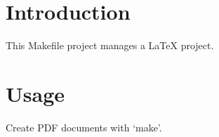 \documentclass{article}
\begin{document}
\maketitle
\tableofcontents
\section{Introduction}
This Makefile project manages a \LaTeX{} project.
\section{Usage}
Create PDF documents with `make'.

\let\thefootnote\relax{}
\end{document}
